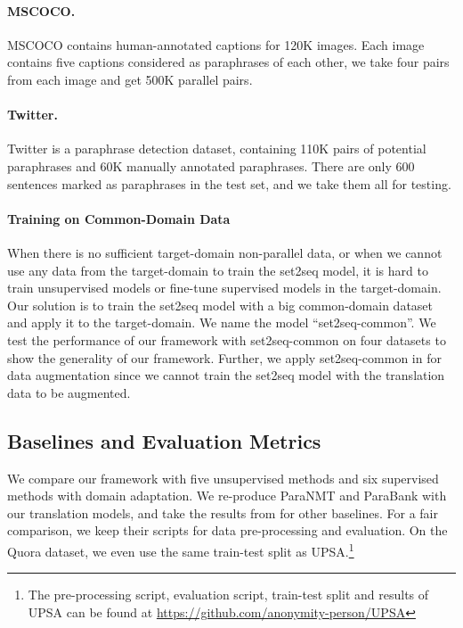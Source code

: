 \paragraph{MSCOCO. } MSCOCO \citep{lin2014microsoft} contains human-annotated captions for 120K images. Each image contains five captions considered as paraphrases of each other, we take four pairs from each image and get 500K parallel pairs.

\paragraph{Twitter. } Twitter \citep{lan2017continuously} is a paraphrase detection dataset, containing 110K pairs of potential paraphrases and 60K manually annotated paraphrases. There are only 600 sentences marked as paraphrases in the test set, and we take them all for testing.

\paragraph{Training on Common-Domain Data} \label{sec:indomain}
When there is no sufficient target-domain non-parallel data, or when we cannot use any data from the target-domain to train the set2seq model, it is hard to train unsupervised models or fine-tune supervised models in the target-domain. Our solution is to train the set2seq model with a big common-domain dataset and apply it to the target-domain. We name the model ``set2seq-common''. We test the performance of our framework with set2seq-common on four datasets to show the generality of our framework. Further, we apply set2seq-common in  for data augmentation since we cannot train the set2seq model with the translation data to be augmented.

\subsection{Baselines and Evaluation Metrics}
We compare our framework with five unsupervised methods and six supervised methods with domain adaptation. We re-produce ParaNMT and ParaBank with our translation models, and take the results from \citet{liu2019unsupervised} for other baselines. For a fair comparison, we keep their scripts for data pre-processing and evaluation. On the Quora dataset, we even use the same train-test split as UPSA.\footnote{The pre-processing script, evaluation script, train-test split and results of UPSA can be found at \url{https://github.com/anonymity-person/UPSA}}


